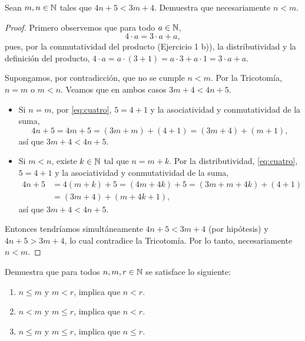 \documentclass[12pt,a4paper]{article}
\begin{document}
    \begin{problema}
        Sean $m,n\in\mathbb{N}$ tales que $4n+5<3m+4$. Demuestra que necesariamente $n<m$.
    \end{problema}

    \begin{proof}
        Primero observemos que para todo $a\in\mathbb{N}$,
        \begin{equation}\label{eq:cuatro}
            4\cdot a=3\cdot a+a,
        \end{equation}
        pues, por la conmutatividad del producto (Ejercicio 1 b)), la distributividad y la definición del producto,
        $4\cdot a=a\cdot(3+1)=a\cdot3+a\cdot1=3\cdot a+a$.

        Supongamos, por contradicción, que no se cumple $n<m$. Por la Tricotomía, $n=m$ o $m<n$. Veamos que en ambos
        casos $3m+4<4n+5$.
        \begin{itemize}
            \item Si $n=m$, por \eqref{eq:cuatro}, $5=4+1$ y la asociatividad y conmutatividad de la suma,
            \begin{equation*}
                4n+5=4m+5=(3m+m)+(4+1)=(3m+4)+(m+1),
            \end{equation*}
            así que $3m+4<4n+5$.
            \item Si $m<n$, existe $k\in\mathbb{N}$ tal que $n=m+k$. Por la distributividad, \eqref{eq:cuatro}, $5=4+1$ y la
            asociatividad y conmutatividad de la suma,
            \begin{align*}
                4n+5 &= 4(m+k)+5=(4m+4k)+5=(3m+m+4k)+(4+1) \\
                &= (3m+4)+(m+4k+1),
            \end{align*}
            así que $3m+4<4n+5$.
        \end{itemize}
        Entonces tendríamos simultáneamente $4n+5<3m+4$ (por hipótesis) y $4n+5>3m+4$, lo cual contradice la
        Tricotomía. Por lo tanto, necesariamente $n<m$.
    \end{proof}

    \begin{problema}
        Demuestra que para todos $n,m,r\in\mathbb{N}$ se satisface lo siguiente:
        \begin{enumerate}[label=\alph*)]
            \item $n\le m$ y $m<r$, implica que $n<r$.
            \item $n<m$ y $m\le r$, implica que $n<r$.
            \item $n\le m$ y $m\le r$, implica que $n\le r$.
        \end{enumerate}
    \end{problema}
\end{document}
